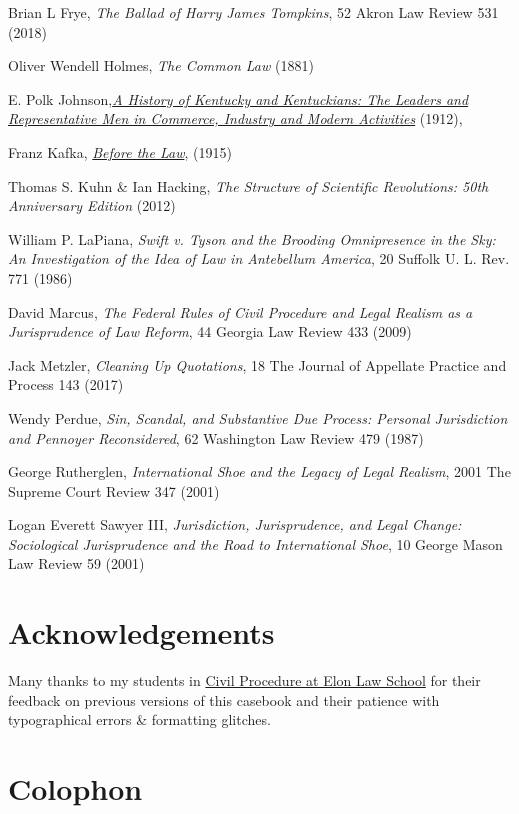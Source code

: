 Brian L Frye, \textit{The Ballad of Harry James Tompkins}, 52 Akron Law Review 531 (2018)

Oliver Wendell Holmes, \textit{The Common Law} (1881)

E. Polk Johnson,\href{https://play.google.com/books/reader?id=FXQUAAAAYAAJ\&pg=GBS.PA1144.w.2.1.0_421}{\textit{A History of Kentucky and Kentuckians: The Leaders and Representative Men in Commerce, Industry and Modern Activities}} (1912), 

Franz Kafka, \href{https://www.kafka-online.info/before-the-law.html}{\textit{Before the Law}}, (1915) 

Thomas S. Kuhn \& Ian Hacking, \textit{The Structure of Scientific Revolutions: 50th Anniversary Edition} (2012)

William P. LaPiana, \textit{Swift v. Tyson and the Brooding Omnipresence in the Sky: An Investigation of the Idea of Law in Antebellum America}, 20 Suffolk U. L. Rev. 771 (1986)

David Marcus, \textit{The Federal Rules of Civil Procedure and Legal Realism as a Jurisprudence of Law Reform}, 44 Georgia Law Review 433 (2009)

Jack Metzler, \textit{Cleaning Up Quotations}, 18 The Journal of Appellate Practice and Process 143 (2017)

Wendy Perdue, \textit{Sin, Scandal, and Substantive Due Process: Personal Jurisdiction and Pennoyer Reconsidered}, 62 Washington Law Review 479 (1987)

George Rutherglen, \textit{International Shoe and the Legacy of Legal Realism}, 2001 The Supreme Court Review 347 (2001)

Logan Everett Sawyer III, \textit{Jurisdiction, Jurisprudence, and Legal Change: Sociological Jurisprudence and the Road to International Shoe}, 10 George Mason Law Review 59 (2001)

\chapter*{Acknowledgements}

Many thanks to my students in \href{https://www.emfink.net/CivPro/}{Civil Procedure at Elon Law School} for their feedback on previous versions of this casebook and their patience with typographical errors \& formatting glitches. 

\chapter*{Colophon}

